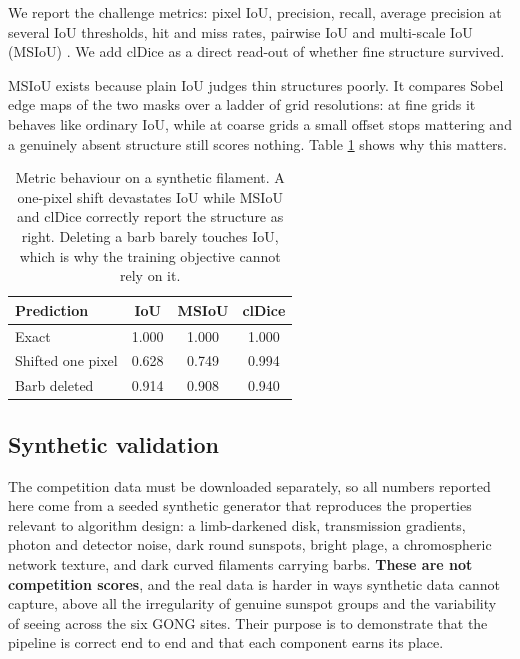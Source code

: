 \documentclass[11pt]{article}
\begin{document}
We report the challenge metrics: pixel IoU, precision, recall, average
precision at several IoU thresholds, hit and miss rates, pairwise IoU and
multi-scale IoU (MSIoU) \cite{msiou2021}. We add clDice as a direct read-out of
whether fine structure survived.

MSIoU exists because plain IoU judges thin structures poorly. It compares
Sobel edge maps of the two masks over a ladder of grid resolutions: at fine
grids it behaves like ordinary IoU, while at coarse grids a small offset stops
mattering and a genuinely absent structure still scores nothing. Table
\ref{tab:metrics} shows why this matters.

\begin{table}[h]
\begin{center}
\begin{tabular}{lccc}
\toprule
Prediction & IoU & MSIoU & clDice \\
\midrule
Exact & 1.000 & 1.000 & 1.000 \\
Shifted one pixel & 0.628 & 0.749 & 0.994 \\
Barb deleted & 0.914 & 0.908 & 0.940 \\
\bottomrule
\end{tabular}
\caption{Metric behaviour on a synthetic filament. A one-pixel shift devastates
IoU while MSIoU and clDice correctly report the structure as right. Deleting a
barb barely touches IoU, which is why the training objective cannot rely on
it.}\label{tab:metrics}
\end{center}
\end{table}

\subsection{Synthetic validation}

The competition data must be downloaded separately, so all numbers reported
here come from a seeded synthetic generator that reproduces the properties
relevant to algorithm design: a limb-darkened disk, transmission gradients,
photon and detector noise, dark round sunspots, bright plage, a chromospheric
network texture, and dark curved filaments carrying barbs. \textbf{These are
not competition scores}, and the real data is harder in ways synthetic data
cannot capture, above all the irregularity of genuine sunspot groups and the
variability of seeing across the six GONG sites. Their purpose is to
demonstrate that the pipeline is correct end to end and that each component
earns its place.
\end{document}
